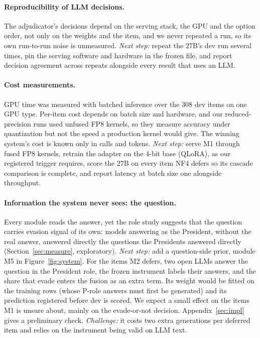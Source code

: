\paragraph{Reproducibility of LLM decisions.}
The adjudicator's decisions depend on the serving stack, the GPU and the option order, not only on the weights and the item, and we never repeated a run, so its own run-to-run noise is unmeasured.
\emph{Next step:} repeat the 27B's dev run several times, pin the serving software and hardware in the frozen file, and report decision agreement across repeats alongside every result that uses an LLM.

\paragraph{Cost measurements.}
GPU time was measured with batched inference over the 308 dev items on one GPU type. Per-item cost depends on batch size and hardware, and our reduced-precision runs used unfused FP8 kernels, so they measure accuracy under quantization but not the speed a production kernel would give.
The winning system's cost is known only in calls and tokens.
\emph{Next step:} serve M1 through fused FP8 kernels, retrain the adapter on the 4-bit base (QLoRA), as our registered trigger requires, score the 27B on every item NF4 defers so its cascade comparison is complete, and report latency at batch size one alongside throughput.

\paragraph{Information the system never sees: the question.}
Every module reads the answer, yet the role study suggests that the question carries evasion signal of its own: models answering as the President, without the real answer, answered directly the questions the Presidents answered directly (Section~\ref{sec:measure}, exploratory).
\emph{Next step:} add a question-side prior, module M5 in Figure~\ref{fig:system}. For the items M2 defers, two open LLMs answer the question in the President role, the frozen instrument labels their answers, and the share that evade enters the fusion as an extra term. Its weight would be fitted on the training rows (whose P-role answers must first be generated) and its prediction registered before dev is scored. We expect a small effect on the items M1 is unsure about, mainly on the evade-or-not decision. Appendix~\ref{sec:impl} gives a preliminary check.
\emph{Challenge:} it costs two extra generations per deferred item and relies on the instrument being valid on LLM text.

